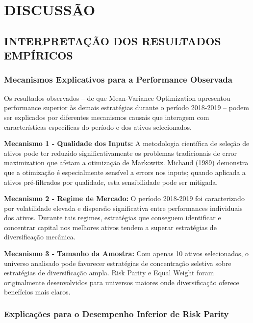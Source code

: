 
\chapter{DISCUSSÃO}

\section{INTERPRETAÇÃO DOS RESULTADOS EMPÍRICOS}

\subsection{Mecanismos Explicativos para a Performance Observada}

Os resultados observados – de que Mean-Variance Optimization apresentou performance superior às demais estratégias durante o período 2018-2019 – podem ser explicados por diferentes mecanismos causais que interagem com características específicas do período e dos ativos selecionados.

\textbf{Mecanismo 1 - Qualidade dos Inputs:} A metodologia científica de seleção de ativos pode ter reduzido significativamente os problemas tradicionais de error maximization que afetam a otimização de Markowitz. Michaud (1989) demonstra que a otimização é especialmente sensível a errors nos inputs; quando aplicada a ativos pré-filtrados por qualidade, esta sensibilidade pode ser mitigada.

\textbf{Mecanismo 2 - Regime de Mercado:} O período 2018-2019 foi caracterizado por volatilidade elevada e dispersão significativa entre performances individuais dos ativos. Durante tais regimes, estratégias que conseguem identificar e concentrar capital nos melhores ativos tendem a superar estratégias de diversificação mecânica.

\textbf{Mecanismo 3 - Tamanho da Amostra:} Com apenas 10 ativos selecionados, o universo analisado pode favorecer estratégias de concentração seletiva sobre estratégias de diversificação ampla. Risk Parity e Equal Weight foram originalmente desenvolvidos para universos maiores onde diversificação oferece benefícios mais claros.

\subsection{Explicações para o Desempenho Inferior de Risk Parity}

